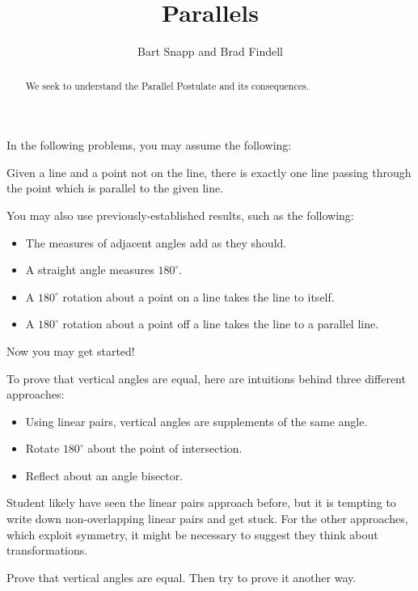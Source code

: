 \documentclass[nooutcomes]{ximera}
\title{Parallels}
\author{Bart Snapp and Brad Findell}
\begin{document}
\begin{abstract}
  We seek to understand the Parallel Postulate and its consequences.
\end{abstract}
\maketitle

In the following problems, you may assume the following: 

\begin{postulate}
Given a line and a point not on the line, there is exactly one line passing through the point which is parallel to the given line.
\end{postulate}

You may also use previously-established results, such as the following: 
\begin{itemize}
\itemsep -3pt
\item The measures of adjacent angles add as they should.
\item A straight angle measures $180^\circ$.  
\item A $180^\circ$ rotation about a point on a line takes the line to itself.  
\item A $180^\circ$ rotation about a point off a line takes the line to a parallel line.  
\end{itemize}

Now you may get started! 

\begin{teachingnote}
To prove that vertical angles are equal, here are intuitions behind three different approaches: 
\begin{itemize}
\item Using linear pairs, vertical angles are supplements of the same angle.  
\item Rotate $180^\circ$ about the point of intersection. 
\item Reflect about an angle bisector. 
\end{itemize}
Student likely have seen the linear pairs approach before, but it is tempting to write down non-overlapping linear pairs and get stuck.  For the other approaches, which exploit symmetry, it might be necessary to suggest they think about transformations.  
\end{teachingnote}

\begin{problem}
Prove that vertical angles are equal.  Then try to prove it another way.  
\vfill
\end{problem}
\end{document}
